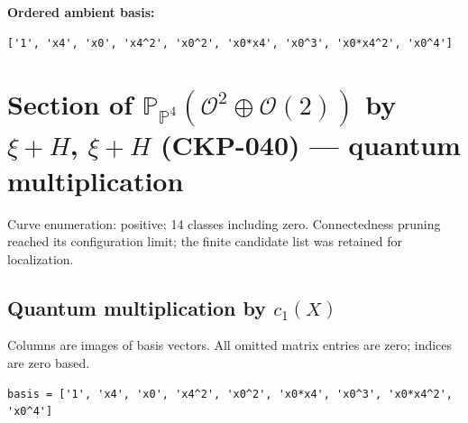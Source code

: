 \documentclass[10pt,a4paper]{article}
\begin{document}
\textbf{Ordered ambient basis:}
\begin{lstlisting}
['1', 'x4', 'x0', 'x4^2', 'x0^2', 'x0*x4', 'x0^3', 'x0*x4^2', 'x0^4']
\end{lstlisting}

\clearpage\section*{Section of $\mathbb P_{\mathbb P^{4}}(\mathcal O^{2}\oplus \mathcal O(2))$ by $\xi +H$, $\xi +H$ (CKP-040) --- quantum multiplication}

Curve enumeration: positive; 14 classes including zero.
Connectedness pruning reached its configuration limit; the finite candidate list was retained for localization.
\subsection*{Quantum multiplication by $c_1(X)$}
Columns are images of basis vectors. All omitted matrix entries are zero; indices are zero based.

\begin{lstlisting}
basis = ['1', 'x4', 'x0', 'x4^2', 'x0^2', 'x0*x4', 'x0^3', 'x0*x4^2', 'x0^4']
\end{lstlisting}
\end{document}
